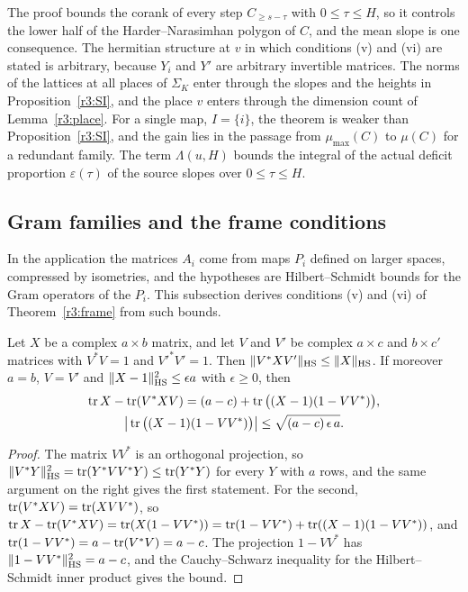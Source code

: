 \begin{remark}\label{r3:rem:frame}
The proof bounds the corank of every step $C_{\ge s-\tau}$ with $0\le\tau\le H$, so it controls the lower half of the Harder--Narasimhan polygon of $C$, and the mean slope is one consequence. The hermitian structure at $v$ in which conditions (v) and (vi) are stated is arbitrary, because $Y_i$ and $Y'$ are arbitrary invertible matrices. The norms of the lattices at all places of $\Sigma_K$ enter through the slopes and the heights in Proposition~\ref{r3:SI}, and the place $v$ enters through the dimension count of Lemma~\ref{r3:place}. For a single map, $I=\{i\}$, the theorem is weaker than Proposition~\ref{r3:SI}, and the gain lies in the passage from $\mu_{\max}(C)$ to $\mu(C)$ for a redundant family. The term $\Lambda(u,H)$ bounds the integral of the actual deficit proportion $\varepsilon(\tau)$ of the source slopes over $0\le\tau\le H$.
\end{remark}

\subsection{Gram families and the frame conditions}\label{r3:sec:gram}

In the application the matrices $A_i$ come from maps $P_i$ defined on larger spaces, compressed by isometries, and the hypotheses are Hilbert--Schmidt bounds for the Gram operators of the $P_i$. This subsection derives conditions (v) and (vi) of Theorem~\ref{r3:frame} from such bounds.

\begin{lemma}\label{r3:compress}
Let $X$ be a complex $a\times b$ matrix, and let $V$ and $V'$ be complex $a\times c$ and $b\times c'$ matrices with $V^*V=1$ and $V'^*V'=1$. Then $\lVert V^*XV'\rVert_{\mathrm{HS}}\le\lVert X\rVert_{\mathrm{HS}}$. If moreover $a=b$, $V=V'$ and $\lVert X-1\rVert_{\mathrm{HS}}^2\le\epsilon a$ with $\epsilon\ge0$, then
\begin{gather*}
\operatorname{tr} X-\operatorname{tr}(V^*XV)=(a-c)+\operatorname{tr}\big((X-1)(1-VV^*)\big),\\
\big\lvert\operatorname{tr}\big((X-1)(1-VV^*)\big)\big\rvert\le\sqrt{(a-c)\,\epsilon\,a}.
\end{gather*}
\end{lemma}

\begin{proof}
The matrix $VV^*$ is an orthogonal projection, so $\lVert V^*Y\rVert_{\mathrm{HS}}^2=\operatorname{tr}(Y^*VV^*Y)\le\operatorname{tr}(Y^*Y)$ for every $Y$ with $a$ rows, and the same argument on the right gives the first statement. For the second, $\operatorname{tr}(V^*XV)=\operatorname{tr}(XVV^*)$, so $\operatorname{tr} X-\operatorname{tr}(V^*XV)=\operatorname{tr}(X(1-VV^*))=\operatorname{tr}(1-VV^*)+\operatorname{tr}((X-1)(1-VV^*))$, and $\operatorname{tr}(1-VV^*)=a-\operatorname{tr}(V^*V)=a-c$. The projection $1-VV^*$ has $\lVert1-VV^*\rVert_{\mathrm{HS}}^2=a-c$, and the Cauchy--Schwarz inequality for the Hilbert--Schmidt inner product gives the bound.
\end{proof}

